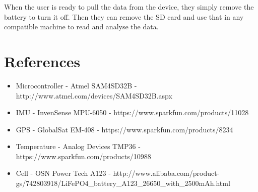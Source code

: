 \documentclass[a4paper, twoside]{article}
\begin{document}
When the user is ready to pull the data from the device, they simply remove the
battery to turn it off. Then they can remove the SD card and use that in any
compatible machine to read and analyse the data.

\section{References}
\begin{itemize}
	\item{Microcontroller - Atmel SAM4SD32B - http://www.atmel.com/devices/SAM4SD32B.aspx}
	\item{IMU - InvenSense MPU-6050 - https://www.sparkfun.com/products/11028}
	\item{GPS - GlobalSat EM-408 - https://www.sparkfun.com/products/8234}
	\item{Temperature - Analog Devices TMP36 - https://www.sparkfun.com/products/10988}
	\item{Cell - OSN Power Tech A123 -
		http://www.alibaba.com/product-gs/742803918/LiFePO4\_battery\_A123\_26650\_with\_2500mAh.html}
\end{itemize}
\end{document}
